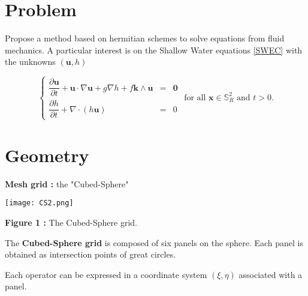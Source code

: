 \documentclass{sciposter}
\begin{document}
\begin{multicols}{3} %

\section{Problem}
   Propose a method based on hermitian schemes to solve equations from fluid mechanics. A particular interest is on the Shallow Water equations \eqref{SWEC} with the unknowns $(\mathbf{u},h)$

\begin{equation}
  \label{SWEC}
  \left\lbrace
  \begin{array}{rcl}
  \dfrac{\partial \mathbf{u}}{\partial t} + \mathbf{u} \cdot \nabla \mathbf{u} + g \nabla h + f \mathbf{k} \wedge \mathbf{u} & = & \mathbf{0} \\
  \dfrac{\partial h}{\partial t} + \nabla \cdot \left( h \mathbf{u} \right) & = & 0
  \end{array}
  \right.\text{ for all } \mathbf{x} \in \mathbb{S}_R^2 \text{ and } t>0.
\end{equation}


\section{Geometry}
\textbf{Mesh grid : } the "Cubed-Sphere"

\begin{center}
\texttt{[image: CS2.png]}

\textbf{Figure 1 :} The Cubed-Sphere grid.
\end{center}

The \textbf{Cubed-Sphere grid} is composed of six panels on the sphere. Each panel is obtained as intersection points of great circles.

Each operator can be expressed in a coordinate system $(\xi,\eta)$ associated with a panel.


\end{multicols}
\end{document}
